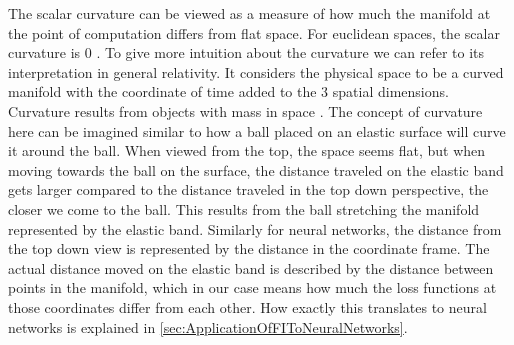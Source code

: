 The scalar curvature can be viewed as a measure of how much the manifold at the point of computation differs from flat space. For euclidean spaces, the scalar curvature is 0 \cite{GeneralRelativityBook}. To give more intuition about the curvature we can refer to its interpretation in general relativity. It considers the physical space to be a curved manifold with the coordinate of time added to the 3 spatial dimensions. Curvature results from objects with mass in space \cite{GeneralRelativityBook}. The concept of curvature here can be imagined similar to how a ball placed on an elastic surface will curve it around the ball. When viewed from the top, the space seems flat, but when moving towards the ball on the surface, the distance traveled on the elastic band gets larger compared to the distance traveled in the top down perspective, the closer we come to the ball. This results from the ball stretching the manifold represented by the elastic band. Similarly for neural networks, the distance from the top down view is represented by the distance in the coordinate frame. The actual distance moved on the elastic band is described by the distance between points in the manifold, which in our case means how much the loss functions at those coordinates differ from each other. How exactly this translates to neural networks is explained in \cref{sec:ApplicationOfFIToNeuralNetworks}.

